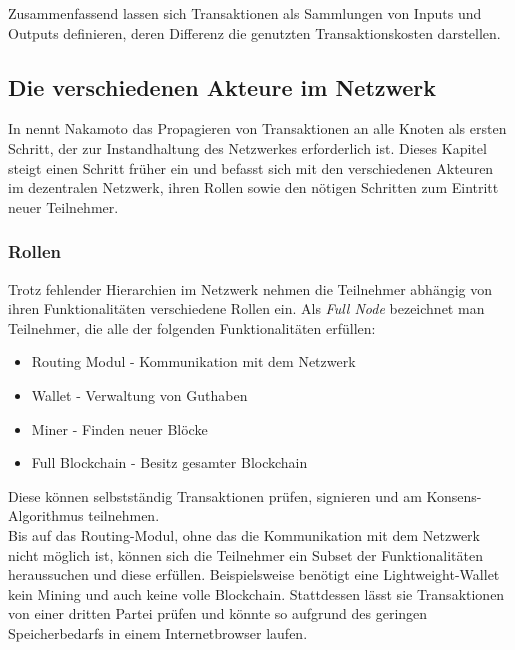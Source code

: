Zusammenfassend lassen sich Transaktionen als Sammlungen von Inputs und Outputs definieren, deren Differenz die genutzten Transaktionskosten darstellen.
\subsection{Die verschiedenen Akteure im Netzwerk}
In \cite{nakamoto_2008} nennt Nakamoto das Propagieren von Transaktionen an alle Knoten als ersten Schritt, der zur Instandhaltung des Netzwerkes erforderlich ist. Dieses Kapitel steigt einen Schritt früher ein und befasst sich mit den verschiedenen Akteuren im dezentralen Netzwerk, ihren Rollen sowie den nötigen Schritten zum Eintritt neuer Teilnehmer.
\subsubsection{Rollen}
Trotz fehlender Hierarchien im Netzwerk nehmen die Teilnehmer abhängig von ihren Funktionalitäten verschiedene Rollen ein. Als \emph{Full Node} bezeichnet man Teilnehmer, die alle der folgenden Funktionalitäten erfüllen:
\begin{itemize}
	\item Routing Modul - Kommunikation mit dem Netzwerk
	\item Wallet - Verwaltung von Guthaben
	\item Miner - Finden neuer Blöcke
	\item Full Blockchain - Besitz gesamter Blockchain
\end{itemize}
Diese können selbstständig Transaktionen prüfen, signieren und am Konsens-Algorithmus teilnehmen.\\
Bis auf das Routing-Modul, ohne das die Kommunikation mit dem Netzwerk nicht möglich ist, können sich die Teilnehmer ein Subset der Funktionalitäten heraussuchen und diese erfüllen. 
Beispielsweise benötigt eine Lightweight-Wallet kein Mining und auch keine volle Blockchain. 
Stattdessen lässt sie Transaktionen von einer dritten Partei prüfen und könnte so aufgrund des geringen Speicherbedarfs in einem Internetbrowser laufen.
